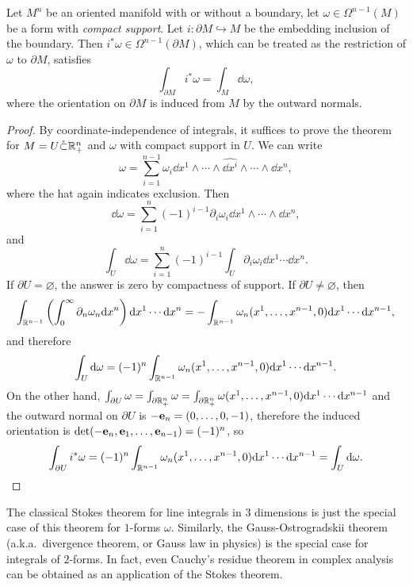 \begin{thm}[Stokes]
    Let $M^n$ be an oriented manifold with or without a boundary, let $\omega\in \Omega^{n-1}(M)$ be a form with \emph{compact support}. Let $i:\partial M\hookrightarrow M$ be the embedding inclusion of the boundary. Then $i^\ast\omega\in\Omega^{n-1}(\partial M)$, which can be treated as the restriction of $\omega$  to $\partial M$, satisfies
    \[\int_{\partial M}i^\ast \omega=\int_M \dd \omega,\]
    where the orientation on $\partial M$ is induced from $M$ by the outward normals.
\end{thm}
\begin{proof}
    By coordinate-independence of integrals, it suffices to prove the theorem for $M=U\mathring\subset \bbR^n_+$ and $\omega$ with compact support in $U$. We can write
    \[\omega=\sum_{i=1}^{n-1}\omega_i \dd x^1\wedge\cdots \wedge \widehat{\dd x^i}\wedge \cdots\wedge \dd x^n,\]
    where the hat again indicates exclusion. Then
    \[\dd \omega=\sum_{i=1}^n (-1)^{i-1}\partial_i\omega_i \dd x^1\wedge\cdots\wedge\dd x^n,\]
    and 
    \[\int_U \dd\omega=\sum_{i=1}^n(-1)^{i-1}\int_U \partial_i\omega_i\dd x^1\cdots\dd x^n.\]
    If $\partial U=\varnothing$, the answer is zero by compactness of support. If $\partial U\neq\varnothing$, then
    \[\int_{\bbR^{n-1}}\left(\int_0^\infty \partial_n\omega_n\dd x^n\right)\dd x^1\cdots\dd x^n=-\int_{\bbR^{n-1}}\omega_n(x^1,\ldots,x^{n-1},0)\dd x^1\cdots\dd x^{n-1},\]
    and therefore 
    \[\int_U \dd\omega=(-1)^n\int_{\bbR^{n-1}}\omega_n(x^1,\ldots,x^{n-1},0)\dd x^1\cdots\dd x^{n-1}.\]
    On the other hand, $\int_{\partial U}\omega=\int_{\partial \bbR^n_+}\omega=\int_{\partial \bbR^n_+}\omega(x^1,\ldots,x^{n-1},0)\dd x^1\cdots \dd x^{n-1}$ and the outward normal on $\partial U$ is $-\bf{e}_n=(0,\ldots,0,-1)$, therefore the induced orientation is $\det(-\bf{e}_n,\bf{e}_1,\ldots,\bf{e}_{n-1})=(-1)^n$, so
    \[\int_{\partial U}i^\ast\omega=(-1)^{n}\int_{\bbR^{n-1}}\omega_n(x^1,\ldots,x^{n-1},0)\dd x^1\cdots\dd x^{n-1}=\int_U \dd\omega.\]
\end{proof}
\begin{rem}
    The classical Stokes theorem for line integrals in $3$ dimensions is just the special case of this theorem for $1$-forms $\omega$. Similarly, the Gauss-Ostrogradskii theorem (a.k.a.\ divergence theorem, or Gauss law in physics) is the special case for integrals of $2$-forms. In fact, even Cauchy's residue theorem in complex analysis can be obtained as an application of the Stokes theorem.
\end{rem}
